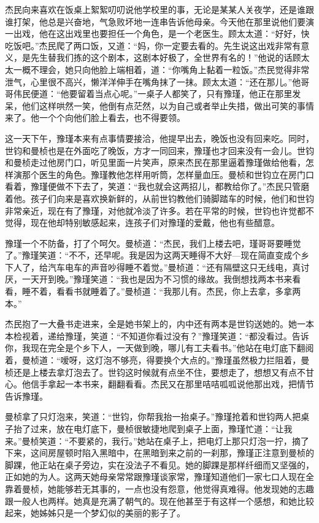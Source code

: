 \par 杰民向来喜欢在饭桌上絮絮叨叨说他学校里的事，无论是某某人关夜学，还是谁跟谁打架，他总是兴奋地，气急败坏地一连串告诉他母亲。今天他在那里说他们要演一出戏，他在这出戏里也要担任一个角色，是一个老医生。顾太太道：“好好，快吃饭吧。”杰民爬了两口饭，又道：“妈，你一定要去看的。先生说这出戏非常有意义，是先生替我们拣的这个剧本，这剧本好极了，全世界有名的！”他说的话顾太太一概不理会，她只向他脸上端相着，道：“你嘴角上黏着一粒饭。”杰民觉得非常泄气，心里很不高兴，懒洋洋伸手在嘴角抹了一抹。顾太太道：“还在那儿。”他哥哥伟民便道：“他要留着当点心呢。”一桌子人都笑了，只有豫瑾，他正在那里发呆，他们这样哄然一笑，他倒有点茫然，以为自己或者举止失措，做出可笑的事情来了。他一个个向他们脸上看去，也不得要领。
\par 这一天下午，豫瑾本来有点事情要接洽，他提早出去，晚饭也没有回来吃。同时，世钧和曼桢也是在外面吃了晚饭，方才一同回来，豫瑾也才回来没有一会儿。世钧和曼桢走过他房门口，听见里面一片笑声，原来杰民在那里逼着豫瑾做给他看，怎样演那个医生的角色。豫瑾教他怎样用听筒，怎样量血压。曼桢和世钧立在房门口看着，豫瑾便做不下去了，笑道：“我也就会这两招儿，都教给你了。”杰民只管磨着他。孩子们向来是喜欢换新鲜的，从前世钧教他们骑脚踏车的时候，他们和世钧非常亲近，现在有了豫瑾，对他就冷淡了许多。若在平常的时候，世钧也许觉都不觉得，现在他却特别敏感起来，连孩子们对豫瑾的爱戴，他也有些醋意。
\par 豫瑾一个不防备，打了个呵欠。曼桢道：“杰民，我们上楼去吧，瑾哥哥要睡觉了。”豫瑾笑道：“不不，还早呢。我是因为这两天睡得不大好—现在简直变成个乡下人了，给汽车电车的声音吵得睡不着觉。”曼桢道：“还有隔壁这只无线电，真讨厌，一天开到晚。”豫瑾笑道：“我也是因为不习惯的缘故。我倒想找两本书来看看，睡不着，看看书就睡着了。”曼桢道：“我那儿有。杰民，你上去拿，多拿两本。”
\par 杰民抱了一大叠书走进来，全是她书架上的，内中还有两本是世钧送她的。她一本本检视着，递给豫瑾，笑道：“不知道你看过没有？”豫瑾笑道：“都没看过。告诉你，我现在完全是个乡下人，一天做到晚，哪儿有工夫看书。”他站在电灯底下翻阅着，曼桢道：“嗳呀，这灯泡不够亮，得要换个大点的。”豫瑾虽然极力拦阻着，曼桢还是上楼去拿灯泡去了。世钧这时候就有点坐不住，要想走了，想想又有点不甘心。他信手拿起一本书来，翻翻看看。杰民又在那里咭咭呱呱说他那出戏，把情节告诉豫瑾。
\par 曼桢拿了只灯泡来，笑道：“世钧，你帮我抬一抬桌子。”豫瑾抢着和世钧两人把桌子抬了过来，放在电灯底下，曼桢很敏捷地爬到桌子上面，豫瑾忙道：“让我来。”曼桢笑道：“不要紧的，我行。”她站在桌子上，把电灯上那只灯泡一拧，摘了下来，这间房屋顿时陷入黑暗中，在黑暗到来之前的一刹那，豫瑾正注意到曼桢的脚踝，他正站在桌子旁边，实在没法子不看见。她的脚踝是那样纤细而又坚强的，正如她的为人。这两天她母亲常常跟豫瑾谈家常，豫瑾知道他们一家七口人现在全靠着曼桢，她能够若无其事的，一点也没有怨意，他觉得真难得。他发现她的志趣跟一般人也两样。她真是充满了朝气的。现在他甚至于有这样一个感想，和她比较起来，她姊姊只是一个梦幻似的美丽的影子了。
